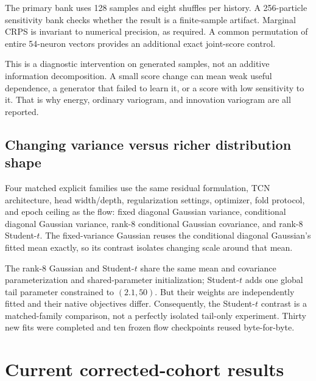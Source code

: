 \documentclass[11pt]{article}
\begin{document}
The primary bank uses 128 samples and eight shuffles per history. A 256-particle sensitivity bank checks whether the result is a finite-sample artifact. Marginal CRPS is invariant to numerical precision, as required. A common permutation of entire 54-neuron vectors provides an additional exact joint-score control.

This is a diagnostic intervention on generated samples, not an additive information decomposition. A small score change can mean weak useful dependence, a generator that failed to learn it, or a score with low sensitivity to it. That is why energy, ordinary variogram, and innovation variogram are all reported.

\subsection{Changing variance versus richer distribution shape}

Four matched explicit families use the same residual formulation, TCN architecture, head width/depth, regularization settings, optimizer, fold protocol, and epoch ceiling as the flow: fixed diagonal Gaussian variance, conditional diagonal Gaussian variance, rank-8 conditional Gaussian covariance, and rank-8 Student-$t$. The fixed-variance Gaussian reuses the conditional diagonal Gaussian's fitted mean exactly, so its contrast isolates changing scale around that mean.

The rank-8 Gaussian and Student-$t$ share the same mean and covariance parameterization and shared-parameter initialization; Student-$t$ adds one global tail parameter constrained to $(2.1,50)$. But their weights are independently fitted and their native objectives differ. Consequently, the Student-$t$ contrast is a matched-family comparison, not a perfectly isolated tail-only experiment. Thirty new fits were completed and ten frozen flow checkpoints reused byte-for-byte.

\section{Current corrected-cohort results}
\end{document}
